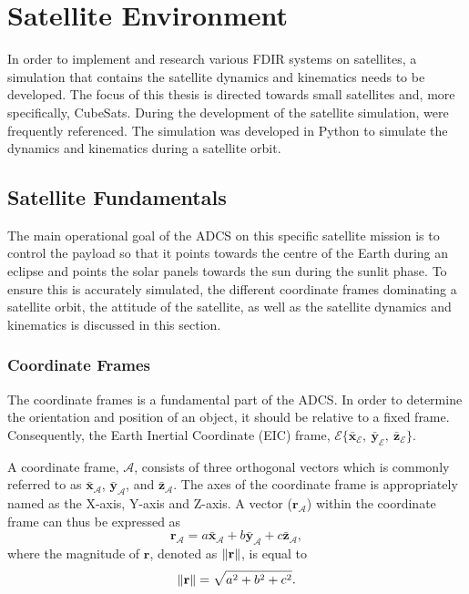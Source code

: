 \chapter{Satellite Environment}
\label{chap:Simulation}
In order to implement and research various FDIR systems on satellites, a simulation that contains the satellite dynamics and kinematics needs to be developed. The focus of this thesis is directed towards small satellites and, more specifically, CubeSats. During the development of the satellite simulation,\cite{auret2012design, JansevanVuuren2015, Jordaan2016, jeger2017determination} were frequently referenced. The simulation was developed in Python to simulate the dynamics and kinematics during a satellite orbit.

\section{Satellite Fundamentals}

 The main operational goal of the ADCS on this specific satellite mission is to control the payload so that it points towards the centre of the Earth during an eclipse and points the solar panels towards the sun during the sunlit phase. To ensure this is accurately simulated, the different coordinate frames dominating a satellite orbit, the attitude of the satellite, as well as the satellite dynamics and kinematics is discussed in this section.

\subsection{Coordinate Frames}
\label{section:CoordinateFrames}
The coordinate frames is a fundamental part of the ADCS. In order to determine the orientation and position of an object, it should be relative to a fixed frame. Consequently, the Earth Inertial Coordinate (EIC) frame, $\mathcal{E}\{\bar{\mathbf{x}}_{\mathcal{E}},~\bar{\mathbf{y}}_{\mathcal{E}},~\bar{\mathbf{z}}_{\mathcal{E}}\}$.

A coordinate frame, $\mathcal{A}$, consists of three orthogonal vectors which is commonly referred to as $\bar{\mathbf{x}}_\mathcal{A}$, $\bar{\mathbf{y}}_\mathcal{A}$, and $\bar{\mathbf{z}}_\mathcal{A}$. The axes of the coordinate frame is appropriately named as the X-axis, Y-axis and Z-axis. A vector ($\mathbf{r}_\mathcal{A}$) within the coordinate frame can thus be expressed as 
\begin{equation}
\mathbf{r}_\mathcal{A} = a\bar{\mathbf{x}}_\mathcal{A} + b\bar{\mathbf{y}}_\mathcal{A} + c\bar{\mathbf{z}}_\mathcal{A},
\end{equation}
where the magnitude of $\mathbf{r}$, denoted as $\left\lVert\mathbf{r}\right\rVert$, is equal to 
\begin{equation}
\left\lVert\mathbf{r}\right\rVert = \sqrt{a^2 + b^2 + c^2}.
\end{equation}

